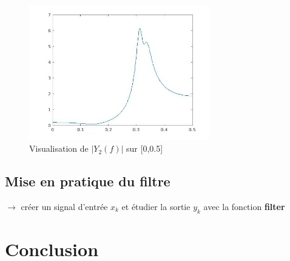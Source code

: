 \documentclass[12,french]{report}
\begin{document}
\begin{figure}[H]
	\center
	\includegraphics[width=0.7\textwidth]{./Images/freqz_Y2}
	\caption{Visualisation de $|Y_2(f)|$ sur [0,0.5]}
\end{figure}\vspace{0.2cm}


\section{Mise en pratique du filtre}

$\rightarrow$ créer un signal d'entrée $x_k$ et étudier la sortie $y_k$ avec la fonction \textbf{filter}


\chapter*{Conclusion}
\end{document}
